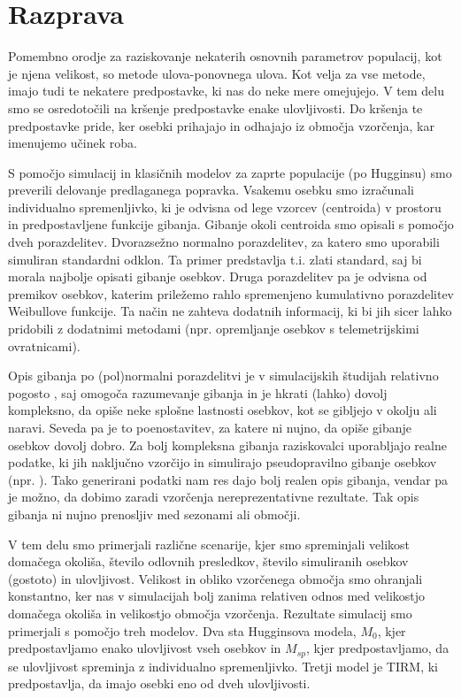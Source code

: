 \section{Razprava}
Pomembno orodje za raziskovanje nekaterih osnovnih parametrov populacij, kot je njena velikost, so metode ulova-ponovnega ulova. Kot velja za vse metode, imajo tudi te nekatere predpostavke, ki nas do neke mere omejujejo. V tem delu smo se osredotočili na kršenje predpostavke enake ulovljivosti. Do kršenja te predpostavke pride, ker osebki prihajajo in odhajajo iz območja vzorčenja, kar imenujemo učinek roba.

S pomočjo simulacij in klasičnih modelov za zaprte populacije (po Hugginsu) smo preverili delovanje predlaganega popravka. Vsakemu osebku smo izračunali individualno spremenljivko, ki je odvisna od lege vzorcev (centroida) v prostoru in predpostavljene funkcije gibanja. Gibanje okoli centroida smo opisali s pomočjo dveh porazdelitev. Dvorazsežno normalno porazdelitev, za katero smo uporabili simuliran standardni odklon.  Ta primer predstavlja t.i. zlati standard, saj bi morala najbolje opisati gibanje osebkov. Druga porazdelitev pa je odvisna od premikov osebkov, katerim priležemo rahlo spremenjeno kumulativno porazdelitev Weibullove funkcije. Ta način ne zahteva dodatnih informacij, ki bi jih sicer lahko pridobili z dodatnimi metodami (npr. opremljanje osebkov s telemetrijskimi ovratnicami).

Opis gibanja po (pol)normalni porazdelitvi je v simulacijskih študijah relativno pogosto \citep{bolker_ecological_2008, ivan_using_2013-1}, saj omogoča razumevanje gibanja in je hkrati (lahko) dovolj kompleksno, da opiše neke splošne lastnosti osebkov, kot se gibljejo v okolju ali naravi. Seveda pa je to poenostavitev, za katere ni nujno, da opiše gibanje osebkov dovolj dobro. Za bolj kompleksna gibanja raziskovalci uporabljajo realne podatke, ki jih naključno vzorčijo in simulirajo pseudopravilno gibanje osebkov (npr. \citet{manning_estimating_2010}). Tako generirani podatki nam res dajo bolj realen opis gibanja, vendar pa je možno, da dobimo zaradi vzorčenja nereprezentativne rezultate. Tak opis gibanja ni nujno prenosljiv med sezonami ali območji.

V tem delu smo primerjali različne scenarije, kjer smo spreminjali velikost domačega okoliša, število odlovnih presledkov, število simuliranih osebkov (gostoto) in ulovljivost. Velikost in obliko vzorčenega območja smo ohranjali konstantno, ker nas v simulacijah bolj zanima relativen odnos med velikostjo domačega okoliša in velikostjo območja vzorčenja. Rezultate simulacij smo primerjali s pomočjo treh modelov. Dva sta Hugginsova modela, $M_0$, kjer predpostavljamo enako ulovljivost vseh osebkov in $M_{sp}$, kjer predpostavljamo, da se ulovljivost spreminja z individualno spremenljivko. Tretji model je TIRM, ki predpostavlja, da imajo osebki eno od dveh ulovljivosti.

